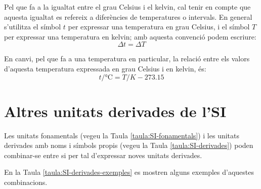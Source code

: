    
    
 
   
  
   
     
\index{\unit{\ohm}}    
\index{\unit{\degreeCelsius}}    

Pel que fa a la igualtat entre el grau Celsius i el kelvin, cal tenir en compte que aquesta igualtat es refereix a diferències de temperatures o intervals. En general s'utilitza el símbol $t$ per expressar una temperatura en grau Celsius, i el símbol $T$ per expressar una temperatura en kelvin; amb aquesta convenció podem escriure:
\begin{equation}
	\Delta t = \Delta T
\end{equation}

En canvi, pel que fa a una temperatura en particular, la relació entre els valors d'aquesta temperatura expressada en grau Celsius i en kelvin, és:
\begin{equation}
	t / \unit{\degreeCelsius} = T / \unit{K} - \num{273,15}
\end{equation}


\section{Altres unitats derivades de l'SI}

Les unitats fonamentals (vegeu la Taula \vref{taula:SI-fonamentals}) i les unitats derivades amb noms i símbols propis (vegeu la Taula \vref{taula:SI-derivades}) poden combinar-se entre si per tal d'expressar noves unitats derivades.

 En la Taula \vref{taula:SI-derivades-exemples} es mostren alguns exemples d'aquestes combinacions.

